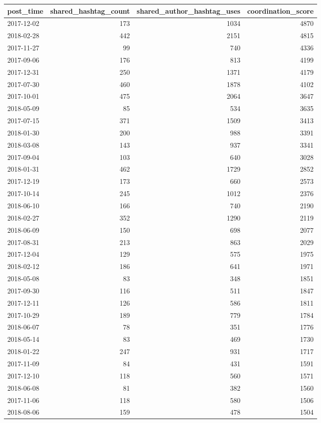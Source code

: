 \begin{tabular}{lrrr}
\toprule
post\_time & shared\_hashtag\_count & shared\_author\_hashtag\_uses & coordination\_score \\
\midrule
2017-12-02 & 173 & 1034 & 4870 \\
2018-02-28 & 442 & 2151 & 4815 \\
2017-11-27 & 99 & 740 & 4336 \\
2017-09-06 & 176 & 813 & 4199 \\
2017-12-31 & 250 & 1371 & 4179 \\
2017-07-30 & 460 & 1878 & 4102 \\
2017-10-01 & 475 & 2064 & 3647 \\
2018-05-09 & 85 & 534 & 3635 \\
2017-07-15 & 371 & 1509 & 3413 \\
2018-01-30 & 200 & 988 & 3391 \\
2018-03-08 & 143 & 937 & 3341 \\
2017-09-04 & 103 & 640 & 3028 \\
2018-01-31 & 462 & 1729 & 2852 \\
2017-12-19 & 173 & 660 & 2573 \\
2017-10-14 & 245 & 1012 & 2376 \\
2018-06-10 & 166 & 740 & 2190 \\
2018-02-27 & 352 & 1290 & 2119 \\
2018-06-09 & 150 & 698 & 2077 \\
2017-08-31 & 213 & 863 & 2029 \\
2017-12-04 & 129 & 575 & 1975 \\
2018-02-12 & 186 & 641 & 1971 \\
2018-05-08 & 83 & 348 & 1851 \\
2017-09-30 & 116 & 511 & 1847 \\
2017-12-11 & 126 & 586 & 1811 \\
2017-10-29 & 189 & 779 & 1784 \\
2018-06-07 & 78 & 351 & 1776 \\
2018-05-14 & 83 & 469 & 1730 \\
2018-01-22 & 247 & 931 & 1717 \\
2017-11-09 & 84 & 431 & 1591 \\
2017-12-10 & 118 & 560 & 1571 \\
2018-06-08 & 81 & 382 & 1560 \\
2017-11-06 & 118 & 580 & 1506 \\
2018-08-06 & 159 & 478 & 1504 \\

\end{tabular}
